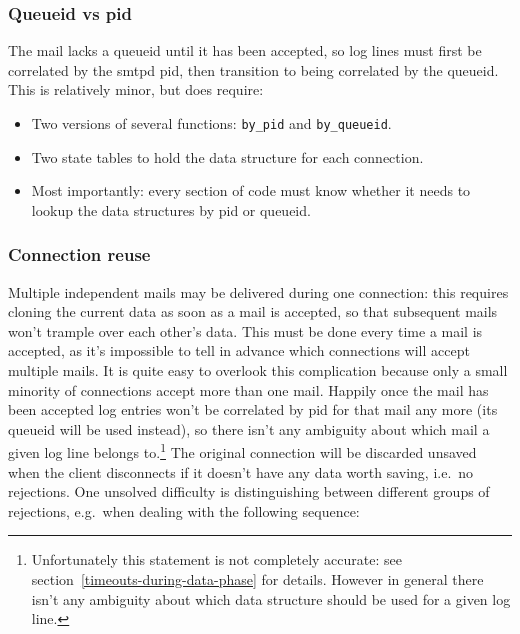 \documentclass[a4paper,12pt,draft]{article}
\begin{document}
\subsubsection{Queueid vs pid}

The mail lacks a queueid until it has been accepted, so log lines must
first be correlated by the smtpd pid, then transition to being correlated
by the queueid.  This is relatively minor, but does require:

\begin{itemize}

    \item Two versions of several functions: \texttt{by\_pid} and
        \texttt{by\_queueid}.

    \item Two state tables to hold the data structure for each connection.

    \item Most importantly: every section of code must know whether it
        needs to lookup the data structures by pid or queueid.

\end{itemize}

\subsubsection{Connection reuse}

Multiple independent mails may be delivered during one connection: this
requires cloning the current data as soon as a mail is accepted, so that
subsequent mails won't trample over each other's data.  This must be done
every time a mail is accepted, as it's impossible to tell in advance which
connections will accept multiple mails.  It is quite easy to overlook this
complication because only a small minority of connections accept more than
one mail. Happily once the mail has been accepted log entries won't be
correlated by pid for that mail any more (its queueid will be used
instead), so there isn't any ambiguity about which mail a given log line
belongs to.\footnote{Unfortunately this statement is not completely
accurate: see section~\ref{timeouts-during-data-phase} for details.
However in general there isn't any ambiguity about which data structure
should be used for a given log line.}  The original connection will be
discarded unsaved when the client disconnects if it doesn't have any data
worth saving, i.e.\ no rejections.  One unsolved difficulty is
distinguishing between different groups of rejections, e.g.\ when dealing
with the following sequence:
\end{document}
